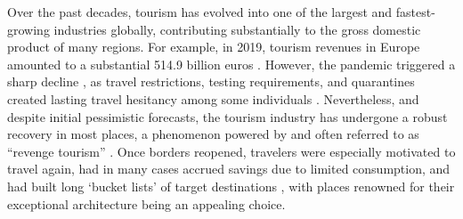 \documentclass[a4paper, 12pt]{article}
\begin{document}
Over the past decades, tourism has evolved into one of the largest and fastest-growing industries globally, contributing substantially to the gross domestic product of many regions. For example, in 2019, tourism revenues in Europe amounted to a substantial 514.9 billion euros \citep{worldtourismorganization2021}. However, the pandemic triggered a sharp decline \citep{plzakova2022, worldtourismorganization2023}, as travel restrictions, testing requirements, and quarantines created lasting travel hesitancy among some individuals \citep{gossling2022, mckercher2024}. Nevertheless, and despite initial pessimistic forecasts, the tourism industry has undergone a robust recovery in most places, a phenomenon powered by and often referred to as ``revenge tourism'' \citep{meenakshi2024, vogler2022}. Once borders reopened, travelers were especially motivated to travel again, had in many cases accrued savings due to limited consumption, and had built long `bucket lists' of target destinations \citep{meenakshi2024}, with places renowned for their exceptional architecture being an appealing choice.
\end{document}
